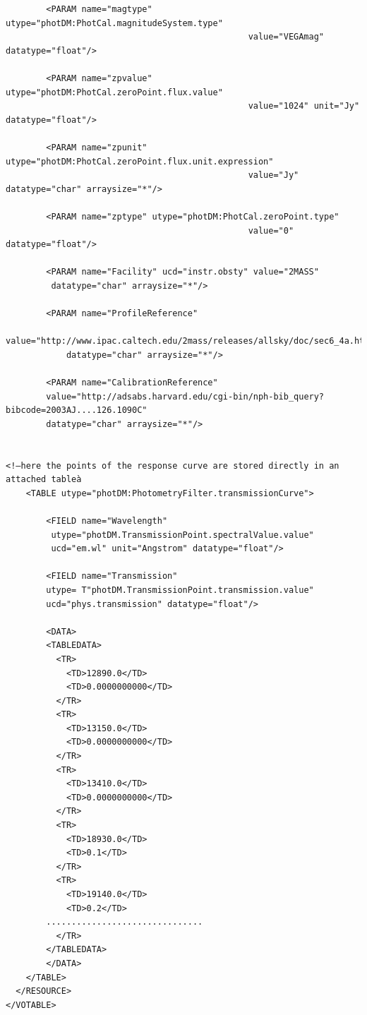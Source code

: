 \documentclass[11pt,a4paper]{ivoa}
\begin{document}
\begin{verbatim}
        <PARAM name="magtype" utype="photDM:PhotCal.magnitudeSystem.type" 
        										value="VEGAmag" datatype="float"/>
 
        <PARAM name="zpvalue" utype="photDM:PhotCal.zeroPoint.flux.value" 
        										value="1024" unit="Jy" datatype="float"/>
    
        <PARAM name="zpunit" utype="photDM:PhotCal.zeroPoint.flux.unit.expression" 
        										value="Jy" datatype="char" arraysize="*"/>
    
        <PARAM name="zptype" utype="photDM:PhotCal.zeroPoint.type" 
        										value="0" datatype="float"/>
 
        <PARAM name="Facility" ucd="instr.obsty" value="2MASS"
         datatype="char" arraysize="*"/>
    
        <PARAM name="ProfileReference" 
        value="http://www.ipac.caltech.edu/2mass/releases/allsky/doc/sec6_4a.html" 
        	datatype="char" arraysize="*"/>
    
        <PARAM name="CalibrationReference"
        value="http://adsabs.harvard.edu/cgi-bin/nph-bib_query?bibcode=2003AJ....126.1090C"
        datatype="char" arraysize="*"/>

 
<!—here the points of the response curve are stored directly in an attached tableà
    <TABLE utype="photDM:PhotometryFilter.transmissionCurve">
      
        <FIELD name="Wavelength"
         utype="photDM.TransmissionPoint.spectralValue.value" 
         ucd="em.wl" unit="Angstrom" datatype="float"/>
      
        <FIELD name="Transmission" 
        utype= T"photDM.TransmissionPoint.transmission.value" 
        ucd="phys.transmission" datatype="float"/>
      
        <DATA>
        <TABLEDATA>
          <TR>
            <TD>12890.0</TD>
            <TD>0.0000000000</TD>
          </TR>
          <TR>
            <TD>13150.0</TD>
            <TD>0.0000000000</TD>
          </TR>
          <TR>
            <TD>13410.0</TD>
            <TD>0.0000000000</TD>
          </TR>
          <TR>
            <TD>18930.0</TD>
            <TD>0.1</TD>
          </TR>
          <TR>
            <TD>19140.0</TD>
            <TD>0.2</TD>
        ...............................
          </TR>
        </TABLEDATA>
        </DATA>
    </TABLE>
  </RESOURCE>
</VOTABLE>

\end{verbatim}
\end{document}
